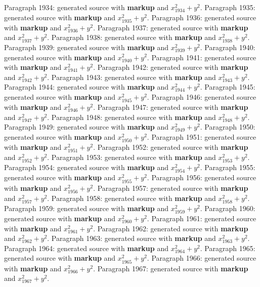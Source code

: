 \documentclass{article}
\begin{document}
Paragraph 1934: generated source with \textbf{markup} and $x_{1934}^2 + y^2$.
Paragraph 1935: generated source with \textbf{markup} and $x_{1935}^2 + y^2$.
Paragraph 1936: generated source with \textbf{markup} and $x_{1936}^2 + y^2$.
Paragraph 1937: generated source with \textbf{markup} and $x_{1937}^2 + y^2$.
Paragraph 1938: generated source with \textbf{markup} and $x_{1938}^2 + y^2$.
Paragraph 1939: generated source with \textbf{markup} and $x_{1939}^2 + y^2$.
Paragraph 1940: generated source with \textbf{markup} and $x_{1940}^2 + y^2$.
Paragraph 1941: generated source with \textbf{markup} and $x_{1941}^2 + y^2$.
Paragraph 1942: generated source with \textbf{markup} and $x_{1942}^2 + y^2$.
Paragraph 1943: generated source with \textbf{markup} and $x_{1943}^2 + y^2$.
Paragraph 1944: generated source with \textbf{markup} and $x_{1944}^2 + y^2$.
Paragraph 1945: generated source with \textbf{markup} and $x_{1945}^2 + y^2$.
Paragraph 1946: generated source with \textbf{markup} and $x_{1946}^2 + y^2$.
Paragraph 1947: generated source with \textbf{markup} and $x_{1947}^2 + y^2$.
Paragraph 1948: generated source with \textbf{markup} and $x_{1948}^2 + y^2$.
Paragraph 1949: generated source with \textbf{markup} and $x_{1949}^2 + y^2$.
Paragraph 1950: generated source with \textbf{markup} and $x_{1950}^2 + y^2$.
Paragraph 1951: generated source with \textbf{markup} and $x_{1951}^2 + y^2$.
Paragraph 1952: generated source with \textbf{markup} and $x_{1952}^2 + y^2$.
Paragraph 1953: generated source with \textbf{markup} and $x_{1953}^2 + y^2$.
Paragraph 1954: generated source with \textbf{markup} and $x_{1954}^2 + y^2$.
Paragraph 1955: generated source with \textbf{markup} and $x_{1955}^2 + y^2$.
Paragraph 1956: generated source with \textbf{markup} and $x_{1956}^2 + y^2$.
Paragraph 1957: generated source with \textbf{markup} and $x_{1957}^2 + y^2$.
Paragraph 1958: generated source with \textbf{markup} and $x_{1958}^2 + y^2$.
Paragraph 1959: generated source with \textbf{markup} and $x_{1959}^2 + y^2$.
Paragraph 1960: generated source with \textbf{markup} and $x_{1960}^2 + y^2$.
Paragraph 1961: generated source with \textbf{markup} and $x_{1961}^2 + y^2$.
Paragraph 1962: generated source with \textbf{markup} and $x_{1962}^2 + y^2$.
Paragraph 1963: generated source with \textbf{markup} and $x_{1963}^2 + y^2$.
Paragraph 1964: generated source with \textbf{markup} and $x_{1964}^2 + y^2$.
Paragraph 1965: generated source with \textbf{markup} and $x_{1965}^2 + y^2$.
Paragraph 1966: generated source with \textbf{markup} and $x_{1966}^2 + y^2$.
Paragraph 1967: generated source with \textbf{markup} and $x_{1967}^2 + y^2$.
\end{document}
